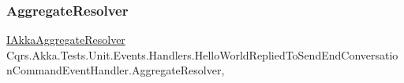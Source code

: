 \subsubsection{\texorpdfstring{Aggregate\+Resolver}{AggregateResolver}}
{\footnotesize\ttfamily \hyperlink{interfaceCqrs_1_1Akka_1_1Domain_1_1IAkkaAggregateResolver}{I\+Akka\+Aggregate\+Resolver} Cqrs.\+Akka.\+Tests.\+Unit.\+Events.\+Handlers.\+Hello\+World\+Replied\+To\+Send\+End\+Conversation\+Command\+Event\+Handler.\+Aggregate\+Resolver\hspace{0.3cm}{\ttfamily [get]}, {\ttfamily [protected]}}

